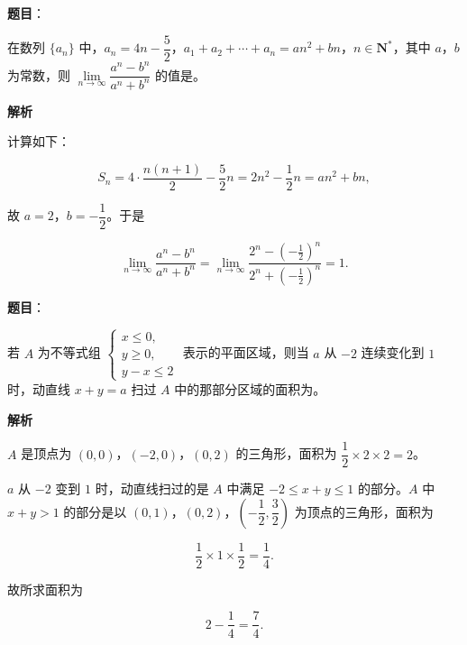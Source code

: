 \begin{answer}

\textbf{题目}：

在数列 $\{a_n\}$ 中，$a_n=4n-\dfrac52$，$a_1+a_2+\cdots+a_n=an^2+bn$，$n\in\mathbf N^*$，其中 $a$，$b$ 为常数，则 $\lim\limits_{n\to\infty}\dfrac{a^n-b^n}{a^n+b^n}$ 的值是\gkblank{}。

\textbf{解析}

计算如下：

\nopagebreak[4]
\[S_n=4\cdot\frac{n(n+1)}2-\frac52n=2n^2-\frac12n=an^2+bn,\]

故 $a=2$，$b=-\dfrac12$。于是

\nopagebreak[4]
\[\lim_{n\to\infty}\frac{a^n-b^n}{a^n+b^n}=\lim_{n\to\infty}\frac{2^n-\left(-\frac12\right)^n}{2^n+\left(-\frac12\right)^n}=1.\]


\end{answer}
\begin{answer}

\textbf{题目}：

若 $A$ 为不等式组 $\begin{cases}x\leqslant0,\\ y\geqslant0,\\ y-x\leqslant2\end{cases}$ 表示的平面区域，则当 $a$ 从 $-2$ 连续变化到 $1$ 时，动直线 $x+y=a$ 扫过 $A$ 中的那部分区域的面积为\gkblank{}。

\textbf{解析}

$A$ 是顶点为 $(0,0)$，$(-2,0)$，$(0,2)$ 的三角形，面积为 $\dfrac12\times2\times2=2$。

$a$ 从 $-2$ 变到 $1$ 时，动直线扫过的是 $A$ 中满足 $-2\leqslant x+y\leqslant1$ 的部分。$A$ 中 $x+y>1$ 的部分是以 $(0,1)$，$(0,2)$，$\left(-\dfrac12,\dfrac32\right)$ 为顶点的三角形，面积为

\nopagebreak[4]
\[\frac12\times1\times\frac12=\frac14.\]

故所求面积为

\nopagebreak[4]
\[2-\frac14=\frac74.\]


\end{answer}
